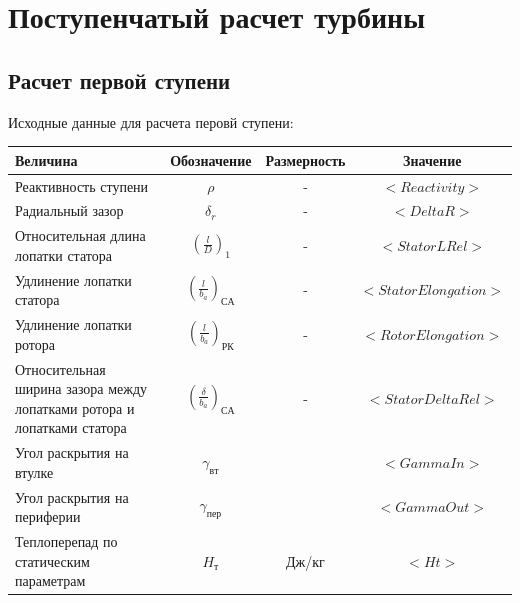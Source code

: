\documentclass[a4paper,10pt]{article}
\begin{document}
\section{Поступенчатый расчет турбины}
\subsection{Расчет первой ступени}
Исходные данные для расчета перовй ступени:

\begin{center}
	\begin{tabular}{|p{7cm}|c|c|c|}
		\hline
		\textbf{Величина} & \textbf{Обозначение} & \textbf{Размерность} & \textbf{Значение} \\ \hline
		Реактивность ступени & $\rho$ & - & $<Reactivity>$ \\ \hline
		Радиальный зазор & $\delta_r$ & - & $<DeltaR>$ \\ \hline
		Относительная длина лопатки статора & $\left( \frac{l}{D} \right)_1$ & - & $<StatorLRel>$ \\ \hline
		Удлинение лопатки статора & $\left( \frac{l}{b_a} \right)_{СА}$ & - & $<StatorElongation>$ \\ \hline 
		Удлинение лопатки ротора & $\left( \frac{l}{b_a} \right)_{РК}$ & - & $<RotorElongation>$ \\ \hline 
		Относительная ширина зазора между лопатками ротора и лопатками статора & $\left( \frac{\delta}{b_a} \right)_{СА}$ & - & $<StatorDeltaRel>$ \\ \hline
		Угол раскрытия на втулке & $\gamma_{вт}$ & \degree & $<GammaIn>$ \\ \hline
		Угол раскрытия на периферии & $\gamma_{пер}$ & \degree & $<GammaOut>$ \\ \hline
		Теплоперепад по статическим параметрам & $H_т$ & Дж/кг & $<Ht>$ \\ \hline
				
	\end{tabular}
\end{center}
\end{document}
